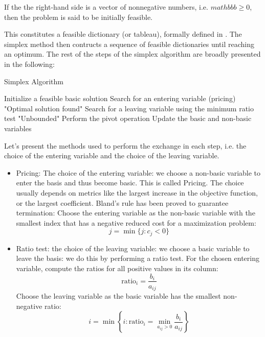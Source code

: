 If the the right-hand side is a vector of nonnegative numbers, i.e. $mathbb{b} \geq 0 $, then
the problem is said to be initially feasible.

This constitutes a feasible dictionary (or tableau), formally defined in \parencite{chvatal1983linear}.
The simplex method then contructs a sequence of feasible dictionaries until reaching an optimum.
The rest of the steps of the simplex algorithm are broadly presented in the following:

\begin{algorithm}
    \caption{Simplex Algorithm}
    \begin{algorithmic}[1]
        \State Initialize a feasible basic solution
            \State Search for an entering variable (pricing)
                \State \Return "Optimal solution found"
            \EndIf
            \State Search for a leaving variable using the minimum ratio test
                \State \Return "Unbounded"
            \EndIf
            \State Perform the pivot operation
            \State Update the basic and non-basic variables
        \EndWhile
        \EndProcedure
    \end{algorithmic}
    \label{algo:simplex_tableau}
\end{algorithm}


Let's present the methods used to perform the exchange in each step, i.e. the choice of the entering
variable and the choice of the leaving variable.

\begin{itemize}
    \item Pricing: The choice of the entering variable: we choose a non-basic variable to enter the basis
          and thus become basic. This is called Pricing. The choice usually depends on metrics
          like the largest increase in the objective function, or the largest coefficient.
          Bland's rule has been proved to guarantee termination:
          Choose the entering variable as the non-basic variable with
          the smallest index that has a negative reduced cost for a maximization problem:
          \[
              j = \min \{ j : c_j < 0 \}
          \]

    \item Ratio test: the choice of the leaving variable: we choose a basic variable to leave the basis:
          we do this by performing a ratio test.
          For the chosen entering variable, compute the ratios for all positive values in its column:
          \[
              \text{ratio}_i = \frac{b_i}{a_{ij}}
          \]
          Choose the leaving variable as the basic variable  has the smallest non-negative ratio:
          \[
              i = \min \left\{ i : \text{ratio}_i = \min_{a_{ij} > 0} \frac{b_i}{a_{ij}} \right\}
          \]
\end{itemize}

